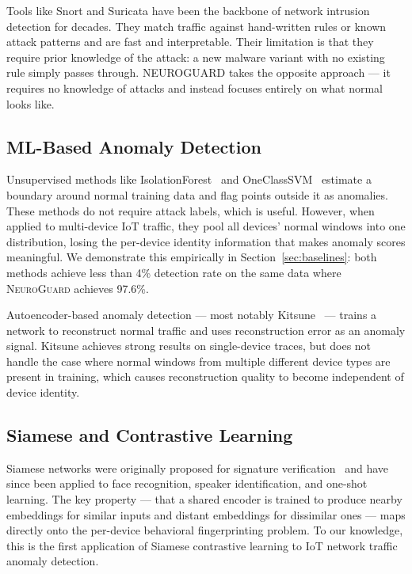 \documentclass[journal,10pt,twoside]{IEEEtran}
\newcommand{\neuroguard}{\textsc{NeuroGuard}}
\begin{document}
Tools like Snort and Suricata have been the backbone of network intrusion
detection for decades.
They match traffic against hand-written rules or known attack patterns and are
fast and interpretable.
Their limitation is that they require prior knowledge of the attack: a new
malware variant with no existing rule simply passes through.
NEUROGUARD takes the opposite approach --- it requires no knowledge of attacks
and instead focuses entirely on what normal looks like.

\subsection{ML-Based Anomaly Detection}

Unsupervised methods like IsolationForest~\cite{liu2008iforest} and
OneClassSVM~\cite{scholkopf1999ocsvm} estimate a boundary around normal
training data and flag points outside it as anomalies.
These methods do not require attack labels, which is useful.
However, when applied to multi-device IoT traffic, they pool all devices'
normal windows into one distribution, losing the per-device identity
information that makes anomaly scores meaningful.
We demonstrate this empirically in Section~\ref{sec:baselines}: both methods
achieve less than 4\% detection rate on the same data where \neuroguard{}
achieves 97.6\%.

Autoencoder-based anomaly detection --- most notably
Kitsune~\cite{mirsky2018kitsune} --- trains a network to reconstruct normal
traffic and uses reconstruction error as an anomaly signal.
Kitsune achieves strong results on single-device traces, but does not handle
the case where normal windows from multiple different device types are
present in training, which causes reconstruction quality to become
independent of device identity.

\subsection{Siamese and Contrastive Learning}

Siamese networks were originally proposed for signature
verification~\cite{hadsell2006contrastive} and have since been applied to
face recognition, speaker identification, and one-shot learning.
The key property --- that a shared encoder is trained to produce nearby
embeddings for similar inputs and distant embeddings for dissimilar ones ---
maps directly onto the per-device behavioral fingerprinting problem.
To our knowledge, this is the first application of Siamese contrastive
learning to IoT network traffic anomaly detection.
\end{document}
